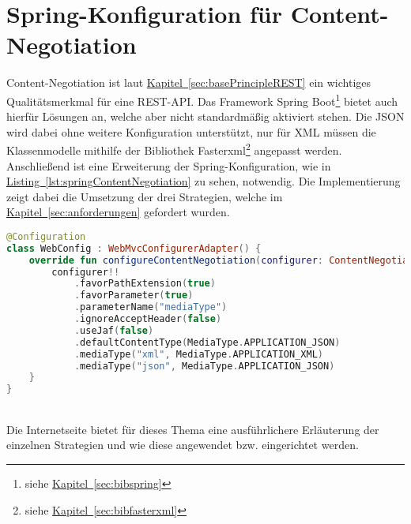 \section{Spring-Konfiguration für Content-Negotiation}\label{sec:contentNegotiation}
Content-Negotiation ist laut \hyperref[sec:basePrincipleREST]{Kapitel~\ref{sec:basePrincipleREST}} ein wichtiges Qualitätsmerkmal für eine \gls{REST}-\gls{API}. Das Framework Spring Boot\footnote{siehe \hyperref[sec:bibspring]{Kapitel~\ref{sec:bibspring}}} bietet auch hierfür Lösungen an, welche aber nicht standardmäßig aktiviert stehen. Die \gls{JSON} wird dabei ohne weitere Konfiguration unterstützt, nur für \gls{XML} müssen die Klassenmodelle mithilfe der Bibliothek Fasterxml\footnote{siehe \hyperref[sec:bibfasterxml]{Kapitel~\ref{sec:bibfasterxml}}} angepasst werden. Anschließend ist eine Erweiterung der Spring-Konfiguration, wie in \hyperref[lst:springContentNegotiation]{Listing~\ref{lst:springContentNegotiation}} zu sehen, notwendig. Die Implementierung zeigt dabei die Umsetzung der drei Strategien, welche im \hyperref[sec:anforderungen]{Kapitel~\ref{sec:anforderungen}} gefordert wurden.
\\
\begin{lstlisting}[style=lstStyleFramed, language=Kotlin, caption={Spring-Konfiguration der drei Content-Negotiation-Strategien}, label=lst:springContentNegotiation, float]
@Configuration
class WebConfig : WebMvcConfigurerAdapter() {
	override fun configureContentNegotiation(configurer: ContentNegotiationConfigurer?) {
		configurer!!
			.favorPathExtension(true)
			.favorParameter(true)
			.parameterName("mediaType")
			.ignoreAcceptHeader(false)
			.useJaf(false)
			.defaultContentType(MediaType.APPLICATION_JSON)
			.mediaType("xml", MediaType.APPLICATION_XML)
			.mediaType("json", MediaType.APPLICATION_JSON)
	}
}
\end{lstlisting}
\\
Die Internetseite \cite{springContentNegotiation} bietet für dieses Thema eine ausführlichere Erläuterung der einzelnen Strategien und wie diese angewendet bzw. eingerichtet werden.

